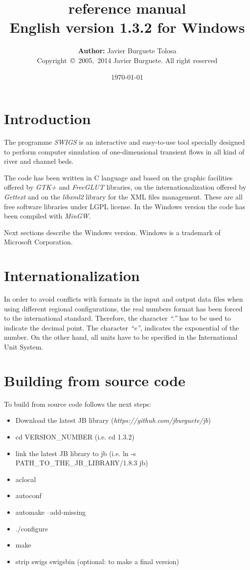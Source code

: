 \documentclass[a4paper,12pt]{article}
\title
{
	{\bf\Large {\swigs} reference manual}\\
	{\large	English version 1.3.2 for Windows}
}
\author
{
	{\bf Author:} Javier Burguete Tolosa\\
	{\small Copyright~\copyright~2005,~2014 Javier Burguete.
	All right reserved}
}
\date{\today}
\newcommand{\swigs}{\emph{SWIGS}}
\newcommand{\IT}[1]{{\sl ``#1''}}
\begin{document}
\maketitle

\tableofcontents
\clearpage

\setlength{\parskip}{\baselineskip / 2}

\section{Introduction}

The programme {\swigs} is an interactive and easy-to-use tool specially designed
to perform computer simulation of one-dimensional transient flows in all kind of
river and channel beds. 

The code has been written in C language and based on the graphic facilities
offered by \emph{GTK+} and \emph{FreeGLUT} libraries, on the
internationalization offered by \emph{Gettext} and on the \emph{libxml2} library
for the XML files management. These are all free software libraries under LGPL
license. In the Windows version the code has been compiled with \emph{MinGW}.

Next sections describe the Windows version. Windows is a trademark of Microsoft
Corporation.

\section{Internationalization}

In order to avoid conflicts with formats in the input and output data files when
using different regional configurations, the real numbers format has been forced
to the international standard. Therefore, the character \IT{.} has to be used to
indicate the decimal point. The character \IT{e}, indicates the exponential of
the number. On the other hand, all units have to be specified in the
International Unit System. 

\section{Building from source code}

To build from source code follows the next steps:
\begin{itemize}
	\item Download the latest JB library
		(\emph{https://github.com/jburguete/jb})
	\item cd VERSION\_NUMBER (i.e. cd 1.3.2)
	\item link the latest JB library to jb (i.e. ln -s
		PATH\_TO\_THE\_JB\_LIBRARY/1.8.3 jb)
	\item aclocal
	\item autoconf
	\item automake --add-missing
	\item ./configure
	\item make
	\item strip swigs swigsbin (optional: to make a final version)
\end{itemize}
\end{document}
